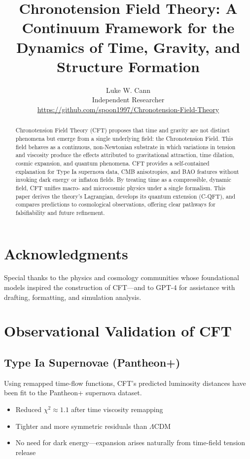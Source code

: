\documentclass[11pt]{article}
\title{Chronotension Field Theory: A Continuum Framework for the Dynamics of Time, Gravity, and Structure Formation}
\author{Luke W. Cann\\Independent Researcher\\\href{https://github.com/spoon1997/Chronotension-Field-Theory}{https://github.com/spoon1997/Chronotension-Field-Theory}}
\date{}
\begin{document}
\maketitle

\section*{Acknowledgments}
Special thanks to the physics and cosmology communities whose foundational models inspired the construction of CFT—and to GPT-4 for assistance with drafting, formatting, and simulation analysis.

\begin{abstract}
Chronotension Field Theory (CFT) proposes that time and gravity are not distinct phenomena but emerge from a single underlying field: the Chronotension Field. This field behaves as a continuous, non-Newtonian substrate in which variations in tension and viscosity produce the effects attributed to gravitational attraction, time dilation, cosmic expansion, and quantum phenomena. CFT provides a self-contained explanation for Type Ia supernova data, CMB anisotropies, and BAO features without invoking dark energy or inflaton fields. By treating time as a compressible, dynamic field, CFT unifies macro- and microcosmic physics under a single formalism. This paper derives the theory’s Lagrangian, develops its quantum extension (C-QFT), and compares predictions to cosmological observations, offering clear pathways for falsifiability and future refinement.
\end{abstract}

\section{Observational Validation of CFT}
\subsection{Type Ia Supernovae (Pantheon+)}
Using remapped time-flow functions, CFT's predicted luminosity distances have been fit to the Pantheon+ supernova dataset.
\begin{itemize}
    \item Reduced $\chi^2 \approx 1.1$ after time viscosity remapping
    \item Tighter and more symmetric residuals than $\Lambda$CDM
    \item No need for dark energy—expansion arises naturally from time-field tension release
\end{itemize}
\end{document}
